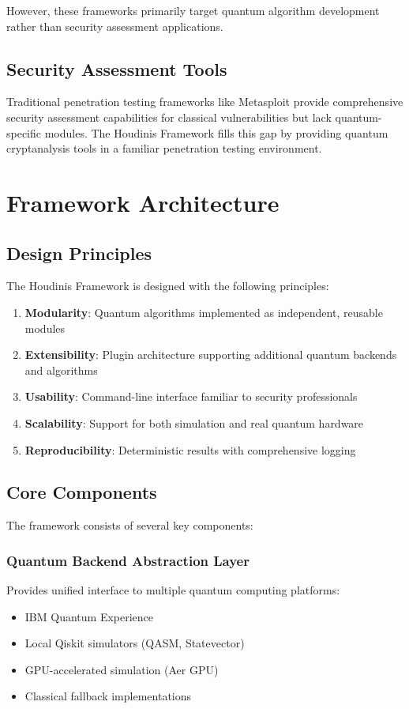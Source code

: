 \documentclass[11pt]{article}
\begin{document}
However, these frameworks primarily target quantum algorithm development rather than security assessment applications.

\subsection{Security Assessment Tools}

Traditional penetration testing frameworks like Metasploit \cite{metasploit2003} provide comprehensive security assessment capabilities for classical vulnerabilities but lack quantum-specific modules. The Houdinis Framework fills this gap by providing quantum cryptanalysis tools in a familiar penetration testing environment.

\section{Framework Architecture}

\subsection{Design Principles}

The Houdinis Framework is designed with the following principles:

\begin{enumerate}
\item \textbf{Modularity}: Quantum algorithms implemented as independent, reusable modules
\item \textbf{Extensibility}: Plugin architecture supporting additional quantum backends and algorithms
\item \textbf{Usability}: Command-line interface familiar to security professionals
\item \textbf{Scalability}: Support for both simulation and real quantum hardware
\item \textbf{Reproducibility}: Deterministic results with comprehensive logging
\end{enumerate}

\subsection{Core Components}

The framework consists of several key components:

\subsubsection{Quantum Backend Abstraction Layer}
Provides unified interface to multiple quantum computing platforms:
\begin{itemize}
\item IBM Quantum Experience
\item Local Qiskit simulators (QASM, Statevector)
\item GPU-accelerated simulation (Aer GPU)
\item Classical fallback implementations
\end{itemize}
\end{document}
